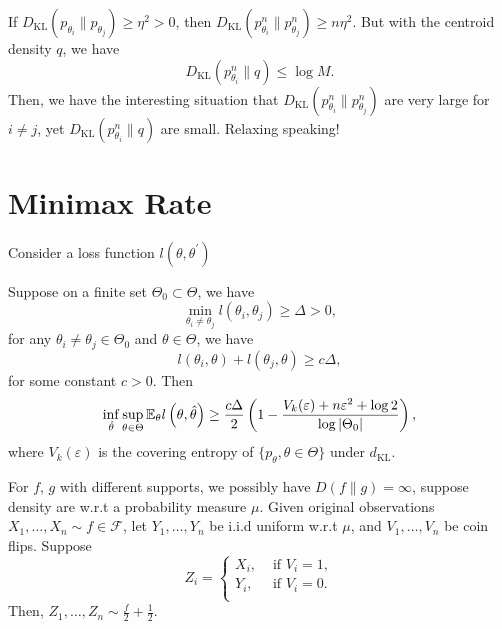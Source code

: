 If \(D_{\text{KL}}\left(p_{\theta_{i}}\|p_{\theta_{j}}\right)\geq\eta^{2}>0\), then \(D_{\text{KL}}\left(p_{\theta_{i}}^{n}\|p_{\theta_{j}}^{n}\right)\geq n\eta^{2}\). But with the centroid density \(q\), we have
\begin{equation*}
	D_{\text{KL}}\left(p_{\theta_{i}}^{n}\|q\right)\leq\log M.
\end{equation*}
Then, we have the interesting situation that \(D_{\text{KL}}\left(p_{\theta_{i}}^{n}\|p_{\theta_{j}}^{n}\right)\) are very large for \(i\neq j\), yet \(D_{\text{KL}}\left(p_{\theta_{i}}^{n}\|q\right)\) are small. Relaxing speaking!

\section{Minimax Rate}

Consider a loss function \(l(\theta,\theta^{\prime})\)

\begin{theorem}
	Suppose on a finite set \(\Theta_{0}\subset\Theta\), we have
	\begin{equation}
		\min_{\theta_{i}\neq\theta_{j}}l(\theta_{i},\theta_{j})\geq\Delta>0,
	\end{equation}
	for any \(\theta_{i}\neq\theta_{j}\in\Theta_{0}\) and \(\theta\in\Theta\), we have
	\begin{equation}
		l(\theta_{i},\theta)+l(\theta_{j},\theta)\geq c\Delta,
	\end{equation}
	for some constant \(c>0\). Then
	\begin{equation}
		\inf_{\hat{\theta}}\sup_{\theta\in\Theta}\mathbb{E}_{\theta}l\left(\theta,\hat{\theta}\right)\geq\frac{c\Delta}{2}\left(1-\frac{V_{k}(\varepsilon)+n\varepsilon^{2}+\log 2}{\log|\Theta_{0}|}\right),
	\end{equation}
	where \(V_{k}(\varepsilon)\) is the covering entropy of \(\{p_{\theta},\theta\in\Theta\}\) under \(d_{\text{KL}}\).
\end{theorem}

For \(f\), \(g\) with different supports, we possibly have \(D(f\|g)=\infty\), suppose density are w.r.t a probability measure \(\mu\). Given original observations \(X_{1},\ldots,X_{n}\sim f\in\mathcal{F}\), let \(Y_{1},\ldots,Y_{n}\) be i.i.d uniform w.r.t \(\mu\), and \(V_{1},\ldots,V_{n}\) be coin flips. Suppose
\begin{equation*}
	Z_{i}=\left\{\begin{array}{ll}
		X_{i}, & \text{ if }V_{i}=1, \\
		Y_{i}, & \text{ if }V_{i}=0. \\
	\end{array}\right.
\end{equation*}
Then, \(Z_{1},\ldots,Z_{n}\sim\frac{f}{2}+\frac{1}{2}\).

